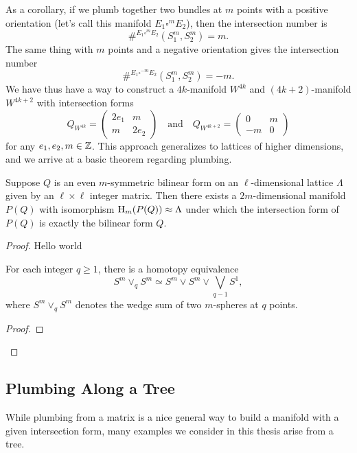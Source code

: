 As a corollary, if we plumb together two bundles at $m$ points with a positive orientation (let's call this manifold $E_1\square^m E_2$), then the intersection number is \[\#^{E_1\square^m E_2}(S^m_1, S^m_2)=m.\] The same thing with $m$ points and a negative orientation gives the intersection number \[\#^{E_1\square^{-m} E_2}(S^m_1,S^m_2)=-m.\]
We have thus have a way to construct a $4k$-manifold $W^{4k}$ and $(4k+2)$-manifold $W^{4k+2}$ with intersection forms
\[
	Q_{W^{4k}} = \begin{pmatrix} 2e_1 & m \\ m & 2e_2\end{pmatrix}
	\quad\textrm{and}\quad
	Q_{W^{4k+2}} = \begin{pmatrix} 0 & m \\ -m & 0\end{pmatrix}
\]
for any $e_1, e_2,m\in \mathbb{Z}$. This approach generalizes to lattices of higher dimensions, and we arrive at a basic theorem regarding plumbing.

\begin{theorem}
	Suppose $Q$ is an even $m$-symmetric bilinear form on an $\ell$-dimensional lattice $\Lambda$ given by an $\ell\times \ell$ integer matrix. Then there exists a $2m$-dimensional manifold $P(Q)$ with isomorphism $\operatorname{H}_{m}(P(Q))\approx \Lambda$ under which the intersection form of $P(Q)$ is exactly the bilinear form $Q$.
\end{theorem}

\begin{proof}
	Hello world


	\begin{lemma}
		For each integer $q\geq 1$, there is a homotopy equivalence
		\[
			S^m\vee_q S^m \simeq S^m\vee S^m \vee \bigvee_{q-1} S^1,
		\]
		where $S^m\vee_q S^m$ denotes the wedge sum of two $m$-spheres at $q$ points.
	\end{lemma}
	\begin{proof}
	\end{proof}

\end{proof}

\subsection{Plumbing Along a Tree}

While plumbing from a matrix is a nice general way to build a manifold with a given intersection form, many examples we consider in this thesis arise from a tree.

